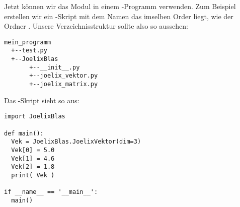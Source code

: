 Jetzt können wir das Modul  in einem \Python-Programm verwenden.
Zum Beispiel erstellen wir ein \Python-Skript mit dem Namen  das imselben Order liegt, wie der Ordner .
Unsere Verzeichnisstruktur sollte also so aussehen:
\begin{lstlisting}[language=plain]
mein_programm
  +--test.py
  +--JoelixBlas
       +--__init__.py
       +--joelix_vektor.py
       +--joelix_matrix.py
\end{lstlisting}
Das \Python-Skript  sieht so aus:
\begin{lstlisting}
import JoelixBlas

def main():
  Vek = JoelixBlas.JoelixVektor(dim=3)
  Vek[0] = 5.0
  Vek[1] = 4.6
  Vek[2] = 1.8
  print( Vek )

if __name__ == '__main__':
  main()
\end{lstlisting}
